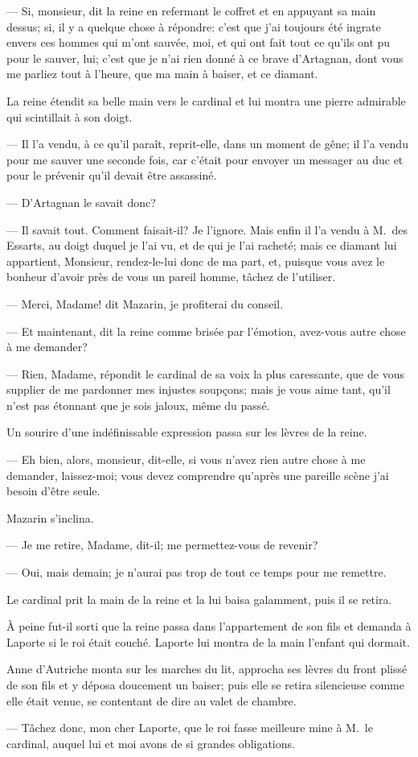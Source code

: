 — Si, monsieur, dit la reine en refermant le coffret et en appuyant sa main dessus; si, il y a quelque chose à répondre: c'est que j'ai toujours été ingrate envers ces hommes qui m'ont sauvée, moi, et qui ont fait tout ce qu'ils ont pu pour le sauver, lui; c'est que je n'ai rien donné à ce brave d'Artagnan, dont vous me parliez tout à l'heure, que ma main à baiser, et ce diamant.

La reine étendit sa belle main vers le cardinal et lui montra une pierre admirable qui scintillait à son doigt.

— Il l'a vendu, à ce qu'il paraît, reprit-elle, dans un moment de gêne; il l'a vendu pour me sauver une seconde fois, car c'était pour envoyer un messager au duc et pour le prévenir qu'il devait être assassiné.

— D'Artagnan le savait donc?

— Il savait tout. Comment faisait-il? Je l'ignore. Mais enfin il l'a vendu à M.~des Essarts, au doigt duquel je l'ai vu, et de qui je l'ai racheté; mais ce diamant lui appartient, Monsieur, rendez-le-lui donc de ma part, et, puisque vous avez le bonheur d'avoir près de vous un pareil homme, tâchez de l'utiliser.

— Merci, Madame! dit Mazarin, je profiterai du conseil.

— Et maintenant, dit la reine comme brisée par l'émotion, avez-vous autre chose à me demander?

— Rien, Madame, répondit le cardinal de sa voix la plus caressante, que de vous supplier de me pardonner mes injustes soupçons; mais je vous aime tant, qu'il n'est pas étonnant que je sois jaloux, même du passé.

Un sourire d'une indéfinissable expression passa sur les lèvres de la reine.

— Eh bien, alors, monsieur, dit-elle, si vous n'avez rien autre chose à me demander, laissez-moi; vous devez comprendre qu'après une pareille scène j'ai besoin d'être seule.

Mazarin s'inclina.

— Je me retire, Madame, dit-il; me permettez-vous de revenir?

— Oui, mais demain; je n'aurai pas trop de tout ce temps pour me remettre.

Le cardinal prit la main de la reine et la lui baisa galamment, puis il se retira.

À peine fut-il sorti que la reine passa dans l'appartement de son fils et demanda à Laporte si le roi était couché. Laporte lui montra de la main l'enfant qui dormait.

Anne d'Autriche monta sur les marches du lit, approcha ses lèvres du front plissé de son fils et y déposa doucement un baiser; puis elle se retira silencieuse comme elle était venue, se contentant de dire au valet de chambre.

— Tâchez donc, mon cher Laporte, que le roi fasse meilleure mine à M.~le cardinal, auquel lui et moi avons de si grandes obligations.